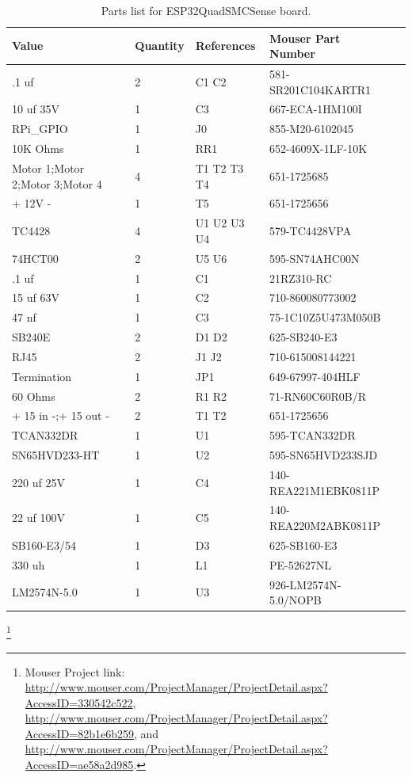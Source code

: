 \begin{table}[htdp]
\begin{centering}\begin{tabular}{|l|l|p{1in}|l|p{.5in}|}
\hline
Value&Quantity&References&Mouser Part Number \\
\hline
.1 uf&2&C1 C2&581-SR201C104KARTR1 \\
\hline
10 uf 35V&1&C3&667-ECA-1HM100I \\
\hline
RPi\_GPIO&1&J0&855-M20-6102045 \\
\hline
10K Ohms&1&RR1&652-4609X-1LF-10K \\
\hline
Motor 1;Motor 2;Motor 3;Motor 4&4&T1 T2 T3 T4&651-1725685 \\
\hline
+ 12V -&1&T5&651-1725656 \\
\hline
TC4428&4&U1 U2 U3 U4&579-TC4428VPA \\
\hline
74HCT00&2&U5 U6&595-SN74AHC00N \\
\hline
.1 uf&1&C1&21RZ310-RC\\
\hline
15 uf 63V&1&C2&710-860080773002\\
\hline
47 nf&1&C3&75-1C10Z5U473M050B\\
\hline
SB240E&2&D1 D2&625-SB240-E3\\
\hline
RJ45&2&J1 J2&710-615008144221\\
\hline
Termination&1&JP1&649-67997-404HLF\\
\hline
60 Ohms&2&R1 R2&71-RN60C60R0B/R\\
\hline
+ 15 in -;+ 15 out -&2&T1 T2&651-1725656\\
\hline
TCAN332DR&1&U1&595-TCAN332DR\\
\hline
SN65HVD233-HT&1&U2&595-SN65HVD233SJD\\
\hline
220 uf 25V&1&C4&140-REA221M1EBK0811P\\
\hline
22 uf 100V&1&C5&140-REA220M2ABK0811P\\
\hline
SB160-E3/54&1&D3&625-SB160-E3\\
\hline
330 uh&1&L1&PE-52627NL\\
\hline
LM2574N-5.0&1&U3&926-LM2574N-5.0/NOPB\\
\hline
\end{tabular}
\caption{Parts list for ESP32QuadSMCSense board.}
\end{centering}\end{table}\footnote{Mouser Project link: 
\url{http://www.mouser.com/ProjectManager/ProjectDetail.aspx?AccessID=330542c522},
\url{http://www.mouser.com/ProjectManager/ProjectDetail.aspx?AccessID=82b1e6b259}, and
\url{http://www.mouser.com/ProjectManager/ProjectDetail.aspx?AccessID=ae58a2d985}.}


